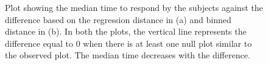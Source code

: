 \documentclass[12]{article}
\begin{document}
\begin{figure}[hbtp]
\centering
{}
\label{turk2-mtime}
	\vspace{-.1in}
\caption[Optional caption for list of figures]{Plot showing the median time to respond by the subjects against the difference based on the regression distance in (a) and binned distance in (b). In both the plots, the vertical line represents the difference equal to 0 when there is at least one null plot similar to the observed plot. The median time decreases with the difference.  }
\end{figure}
\end{document}
